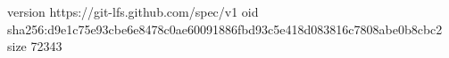 version https://git-lfs.github.com/spec/v1
oid sha256:d9e1c75e93cbe6e8478c0ae60091886fbd93c5e418d083816c7808abe0b8cbc2
size 72343
